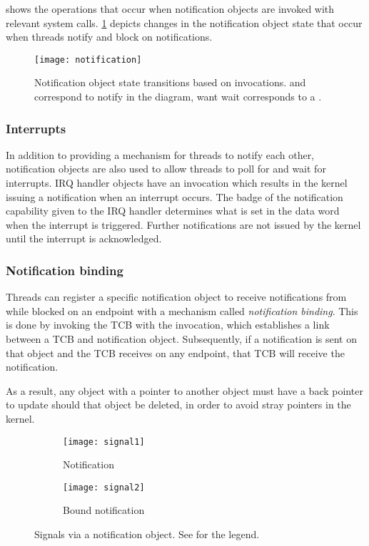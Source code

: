  shows the operations that occur when notification objects are
invoked with relevant system calls. \cref{f:notification} depicts changes in the notification object
state that occur when threads notify and block on notifications. 

\begin{figure}
    \centering
    \texttt{[image: notification]}
    \caption{Notification object state transitions based on invocations.  and
     correspond to notify in the diagram, want wait corresponds to a .}
    \label{f:notification}
\end{figure}

\subsubsection{Interrupts}

In addition to providing a mechanism for threads to notify each other, notification objects are also
used to allow threads to poll for and wait for interrupts. IRQ handler objects have an invocation
 which results in the kernel issuing a notification when an interrupt
occurs. The badge of the notification capability given to the IRQ handler determines what is set in
the data word when the interrupt is triggered. Further notifications are not issued by the kernel
until the interrupt is acknowledged.

\subsubsection{Notification binding}
\label{s:notification-binding}
Threads can register a specific notification object to receive notifications from while blocked on
an endpoint with a mechanism called \emph{notification binding}. This is done by invoking the TCB
with the  invocation, which establishes a link between a TCB and
notification object. Subsequently, if a notification is sent on that object and the TCB receives
on any endpoint, that TCB will receive the notification. 

As a result, any object with a pointer to another object must have a back pointer to update should that object be
deleted, in order to avoid stray pointers in the kernel. 


\begin{figure}
    \centering
    \begin{subfigure}[h]{0.48\textwidth}
        \centering
        \texttt{[image: signal1]}
        \caption{Notification}
        \label{f:signal1}
    \end{subfigure}%
    \begin{subfigure}[h]{0.48\textwidth}
        \centering
        \texttt{[image: signal2]}
        \caption{Bound notification}
        \label{f:signal2}
    \end{subfigure}
    \label{f:signal}
    \caption{Signals via a notification object. See  for the legend.}
\end{figure}



